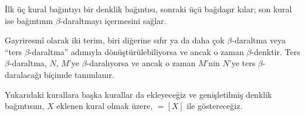 İlk üç kural bağıntıyı bir denklik bağıntısı, sonraki üçü bağdaşır kılar; son
kural ise bağıntının $\beta$-daraltmayı içermesini sağlar.

Gayriresmî olarak iki terim, biri diğerine sıfır ya da daha çok
$\beta$-daraltma veya ``ters $\beta$-daraltma'' adımıyla dönüştürülebiliyorsa
ve ancak o zaman $\beta$-denktir. Ters $\beta$-daraltma, $N$, $M$'ye
$\beta$-daralıyorsa ve ancak o zaman $M$'nin $N$'ye ters
$\beta$-daralacağı biçimde tanımlanır.

Yukarıdaki kurallara başka kurallar da ekleyeceğiz ve genişletilmiş denklik
bağıntısını, $X$ eklenen kural olmak üzere, $\equal[X]$ ile göstereceğiz.

